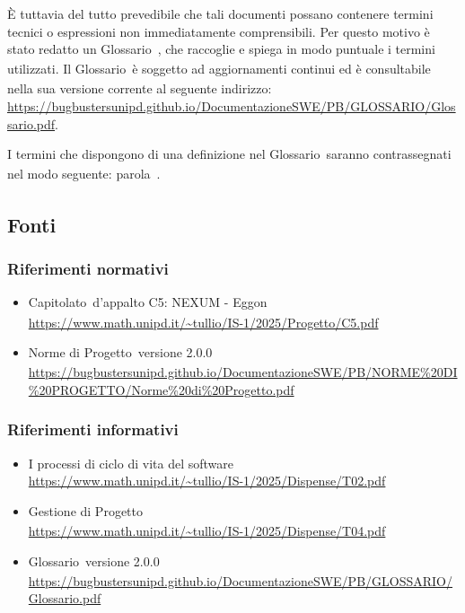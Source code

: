 \documentclass[a4paper,12pt]{article}
\newcommand{\pediceG}{\texorpdfstring{\textsubscript{\scalebox{0.6}{\textbf{G}}}~}{G}}
\begin{document}
È tuttavia del tutto prevedibile che tali documenti possano contenere termini tecnici o espressioni non immediatamente comprensibili. Per questo motivo è stato redatto un Glossario\pediceG, che raccoglie e spiega in modo puntuale i termini utilizzati. Il Glossario\pediceG è soggetto ad aggiornamenti continui ed è consultabile nella sua versione corrente al seguente indirizzo: \url{https://bugbustersunipd.github.io/DocumentazioneSWE/PB/GLOSSARIO/Glossario.pdf}.

I termini che dispongono di una definizione nel Glossario\pediceG saranno contrassegnati nel modo seguente: parola\pediceG.

\subsection{Fonti}

\subsubsection{Riferimenti normativi}
\begin{itemize}
    \item Capitolato\pediceG d'appalto C5: NEXUM - Eggon \\
    \url{https://www.math.unipd.it/~tullio/IS-1/2025/Progetto/C5.pdf} \\
    \item Norme di Progetto\pediceG versione 2.0.0 \\
    \url{https://bugbustersunipd.github.io/DocumentazioneSWE/PB/NORME%20DI%20PROGETTO/Norme%20di%20Progetto.pdf} \\
\end{itemize}

\subsubsection{Riferimenti informativi}
\begin{itemize}
    \item I processi di ciclo di vita del software \\
    \url{https://www.math.unipd.it/~tullio/IS-1/2025/Dispense/T02.pdf} \\
    \item Gestione di Progetto\pediceG \\
    \url{https://www.math.unipd.it/~tullio/IS-1/2025/Dispense/T04.pdf} \\
      \item Glossario\pediceG versione 2.0.0 \\
    \url{https://bugbustersunipd.github.io/DocumentazioneSWE/PB/GLOSSARIO/Glossario.pdf} \\
\end{itemize}
\end{document}
